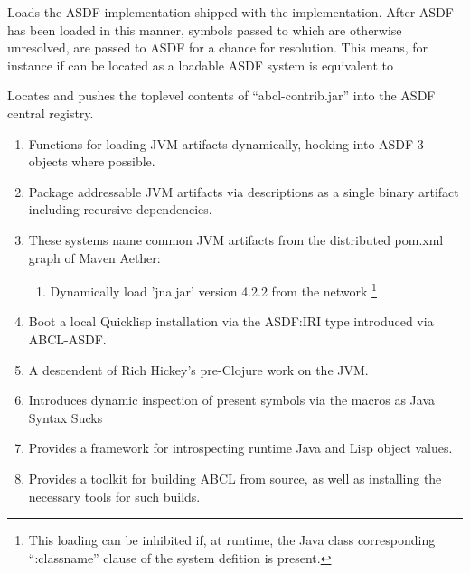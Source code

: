 \documentclass[10pt]{book}
\begin{document}
\begin{description}

  \item{} 
    Loads the \textsc{ASDF} implementation shipped
    with the implementation.  After \textsc{ASDF} has been loaded in
    this manner, symbols passed to  which are
    otherwise unresolved, are passed to ASDF for a chance for
    resolution.  This means, for instance if  can be
    located as a loadable \textsc{ASDF} system  is equivalent to .

  \item{} 
    Locates and pushes the toplevel contents of
    ``abcl-contrib.jar'' into the \textsc{ASDF} central registry.  

    \begin{enumerate}
      \item {} 
        Functions for loading JVM artifacts
        dynamically, hooking into ASDF 3 objects where possible.
      \item {} 
        Package addressable JVM artifacts via
         descriptions as a single binary artifact
        including recursive dependencies.
      \item {} 
        These systems name common JVM artifacts from
        the distributed pom.xml graph of Maven Aether:
        \begin{enumerate}
          \item {} 
            Dynamically load 'jna.jar' version 4.2.2
            from the network \footnote{This loading can be inhibited
              if, at runtime, the Java class corresponding
              ``:classname'' clause of the system defition is present.}
        \end{enumerate}
      \item {} Boot a local Quicklisp installation
        via the ASDF:IRI type introduced via ABCL-ASDF.

      \item {} A descendent of Rich Hickey's pre-Clojure work
        on the JVM.
      \item {} Introduces dynamic inspection of present
        symbols via the  macros as Java Syntax
        Sucks
      \item {} Provides a framework for
        introspecting runtime Java and Lisp object values.
      \item {} Provides a toolkit for building ABCL
        from source, as well as installing the necessary tools for
        such builds.
        
\end{enumerate}

\end{description}
\end{document}
